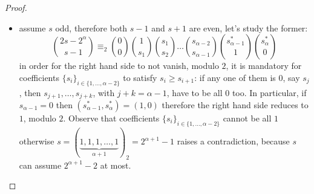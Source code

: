 \begin{proof}
\begin{itemize}
\begin{itemize}
            \item assume $s$ odd, therefore both $s-1$ and $s+1$ are even, 
                let's study the former:
                \begin{displaymath}
                        {{2s-2^{{\alpha}}}\choose{s-1}}  
                        \equiv_{2}
                        {{0}\choose{0}} 
                        {{1}\choose{s_{1}}}
                        {{s_{1}}\choose{s_{2}}}
                        \ldots
                        {{s_{{\alpha}-2}}\choose{s_{{\alpha}-1}}}
                        {{s_{{\alpha}-1}^{*}}\choose{1}}
                        {{s_{{\alpha}}^{*}}\choose{0}}
                \end{displaymath}
                in order for the right hand side to not vanish, modulo $2$,
                it is mandatory for coefficients $\lbrace s_{i}\rbrace_{i\in\lbrace1,\ldots,{\alpha}-2\rbrace}$
                to satisfy $s_{i}\geq s_{i+1}$: if any one of them is $0$, say $s_{j}$, then
                $s_{j+1},\ldots,s_{j+k}$, with $j+k={\alpha}-1$,
                have to be all $0$ too. In particular, if $s_{{\alpha}-1}=0$ then 
                $(s_{{\alpha}-1}^{*},s_{{\alpha}}^{*})=(1,0)$
                therefore the right hand side reduces to $1$, modulo $2$.
                Observe that coefficients $\lbrace s_{i}\rbrace_{i\in\lbrace1,\ldots,{\alpha}-2\rbrace}$
                cannot be all $1$ otherwise 
                $s=(\underbrace{1,1,1,\ldots,1}_{{\alpha}+1})_{2}=2^{{\alpha}+1}-1$ raises a contradiction, because
                $s$ can assume $2^{{\alpha}+1}-2$ at most. 
                

\end{itemize}
\end{itemize}
\end{proof}
